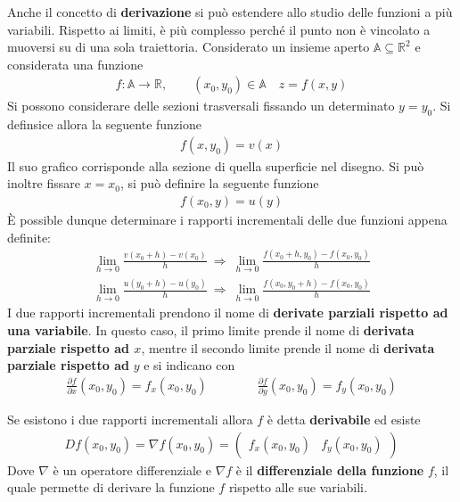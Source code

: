 \documentclass[a4paper, oneside]{book}
\begin{document}
Anche il concetto di \textbf{derivazione} si può estendere allo studio 
delle funzioni a più variabili. Rispetto ai limiti, è più complesso perché 
il punto non è vincolato a muoversi su di una sola traiettoria.
Considerato un insieme aperto $\mathbb{A} \subseteq \mathbb{R}^{2}$ e considerata una funzione
\begin{gather*}
    f: \mathbb{A} \to \mathbb{R}, \qquad (x_0, y_0) \in \mathbb{A} \quad z = f(x, y)
\end{gather*} 
Si possono considerare delle sezioni trasversali fissando un determinato $y = y_0$. 
Si definsice allora la seguente funzione 
\begin{gather*}
    f(x, y_0) = v(x)
\end{gather*} 
Il suo grafico corrisponde alla sezione di quella superficie nel disegno.
Si può inoltre fissare $x = x_0$, si può definire la seguente funzione
\begin{gather*}
    f(x_0, y) = u(y)
\end{gather*}
È possible dunque determinare i rapporti incrementali delle due funzioni appena definite:
\begin{gather*}
    \lim_{h \to 0} \frac{v(x_0 + h)- v(x_0) }{h} \ \Longrightarrow \ \lim_{h \to 0}\frac{f(x_0 + h, y_0) - f(x_0, y_0)}{h} \\
    \lim_{h \to 0} \frac{u(y_0 + h)- u(y_0) }{h} \ \Longrightarrow \ \lim_{h \to 0}\frac{f(x_0, y_0 + h) - f(x_0, y_0)}{h} 
\end{gather*}
I due rapporti incrementali prendono il nome di \textbf{derivate parziali rispetto ad una variabile}. 
In questo caso, il primo limite prende il nome di \textbf{derivata parziale rispetto ad $x$}, mentre
il secondo limite prende il nome di \textbf{derivata parziale rispetto ad} $y$ e si indicano con
\begin{align}
    \frac{\partial f}{\partial x}(x_0, y_0)  = f_x(x_0, y_0)\qquad \qquad \frac{\partial f}{\partial y}(x_0, y_0) = f_y(x_0, y_0)  
\end{align}
\begin{definition}
    Se esistono i due rapporti incrementali allora $f$ è detta \textbf{derivabile} ed esiste
    \begin{align}
        Df(x_0, y_0) = \nabla f(x_0, y_0) = \begin{pmatrix}
            f_x(x_0, y_0) & f_y(x_0, y_0)
        \end{pmatrix}
    \end{align}
    Dove $\nabla$ è un operatore differenziale e $\nabla f$ è il 
    \textbf{differenziale della funzione} $f$, il quale permette di derivare
    la funzione $f$ rispetto alle sue variabili.
\end{definition}
\end{document}
